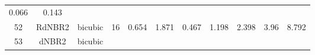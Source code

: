 \documentclass[twoside,12pt,final]{ucthesis-CA2012}
\begin{document}
\begin{ucmainmatter}
\begin{longtable}[]{@{}ccccccccccc@{}}
\begin{minipage}[t]{0.05\columnwidth}
0.066\strut
\end{minipage} & \begin{minipage}[t]{0.05\columnwidth}\centering\strut
0.143\strut
\end{minipage}\tabularnewline
\begin{minipage}[t]{0.04\columnwidth}\centering\strut
52\strut
\end{minipage} & \begin{minipage}[t]{0.11\columnwidth}\centering\strut
RdNBR2\strut
\end{minipage} & \begin{minipage}[t]{0.06\columnwidth}\centering\strut
bicubic\strut
\end{minipage} & \begin{minipage}[t]{0.08\columnwidth}\centering\strut
16\strut
\end{minipage} & \begin{minipage}[t]{0.08\columnwidth}\centering\strut
0.654\strut
\end{minipage} & \begin{minipage}[t]{0.07\columnwidth}\centering\strut
1.871\strut
\end{minipage} & \begin{minipage}[t]{0.07\columnwidth}\centering\strut
0.467\strut
\end{minipage} & \begin{minipage}[t]{0.07\columnwidth}\centering\strut
1.198\strut
\end{minipage} & \begin{minipage}[t]{0.05\columnwidth}\centering\strut
2.398\strut
\end{minipage} & \begin{minipage}[t]{0.05\columnwidth}\centering\strut
3.96\strut
\end{minipage} & \begin{minipage}[t]{0.05\columnwidth}\centering\strut
8.792\strut
\end{minipage}\tabularnewline
\begin{minipage}[t]{0.04\columnwidth}\centering\strut
53\strut
\end{minipage} & \begin{minipage}[t]{0.11\columnwidth}\centering\strut
dNBR2\strut
\end{minipage} & \begin{minipage}[t]{0.06\columnwidth}\centering\strut
bicubic\strut
\end{minipage} & \begin{minipage}[t]{0.08\columnwidth}\centering\strut

\end{minipage}
\end{longtable}
\end{ucmainmatter}
\end{document}
